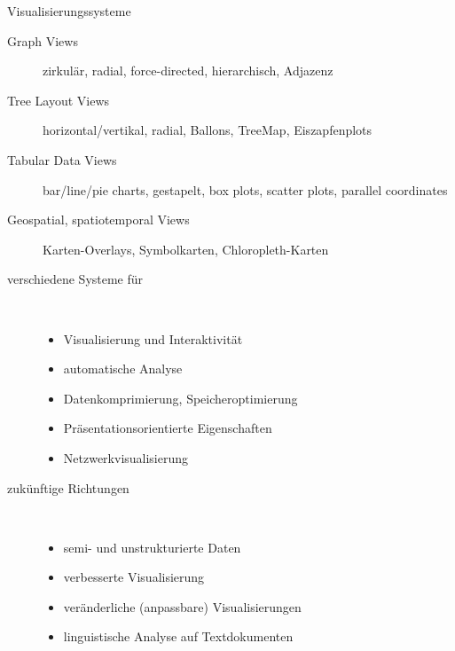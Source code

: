 \begin{TOP}{Visualisierungssysteme}
	\vspace*{-1.5\baselineskip}
	\begin{description}
		\item[Graph Views] zirkulär, radial, force-directed, hierarchisch, Adjazenz
		\item[Tree Layout Views] horizontal/vertikal, radial, Ballons, TreeMap, Eiszapfenplots
		\item[Tabular Data Views] bar/line/pie charts, gestapelt, box plots, scatter plots, parallel coordinates
		\item[Geospatial, spatiotemporal Views] Karten-Overlays, Symbolkarten, Chloropleth-Karten
		\item[verschiedene Systeme für] \ \\\vspace*{-\baselineskip}
			\begin{itemize}
				\item Visualisierung und Interaktivität
				\item automatische Analyse
				\item Datenkomprimierung, Speicheroptimierung
				\item Präsentationsorientierte Eigenschaften
				\item Netzwerkvisualisierung
			\end{itemize}
		\item[zukünftige Richtungen]\ \\\vspace*{-\baselineskip}
			\begin{itemize}
				\item semi- und unstrukturierte Daten
				\item verbesserte Visualisierung
				\item veränderliche (anpassbare) Visualisierungen
				\item linguistische Analyse auf Textdokumenten
			\end{itemize}
	\end{description}
	
\end{TOP}